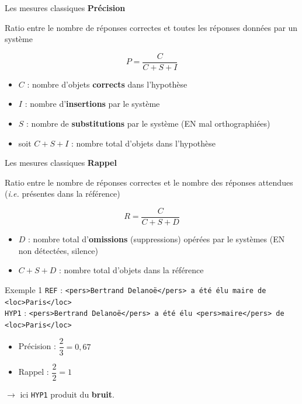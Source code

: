 \documentclass[xetex,xcolor={table,usenames,dvipsnames}]{beamer}
\newcommand{\bolder}[1]{{\color{purple}\bfseries#1}}
\begin{document}
\begin{frame}{Les mesures classiques}
	\bolder{Précision}
	
	Ratio entre le nombre de \textcolor{deepred}{réponses correctes} et toutes les \textcolor{deepred}{réponses données} par un système
	
	\begin{equation*}
		P = \dfrac{C}{C + S + I}
	\end{equation*}
	
	\begin{itemize}
		\item $C$ : nombre d'objets \textcolor{deepblue}{\textbf{corrects}} dans l'hypothèse
		\item $I$ : nombre d'\textcolor{deepblue}{\textbf{insertions}} par le système
		\item $S$ : nombre de \textcolor{deepblue}{\textbf{substitutions}} par le système (\textsc{EN} mal orthographiées)
		\item soit $C + S + I$ : nombre total d'objets dans l'hypothèse
	\end{itemize}
\end{frame}

\begin{frame}{Les mesures classiques}
	\bolder{Rappel}
	
	Ratio entre le nombre de \textcolor{deepred}{réponses correctes} et le nombre des \textcolor{deepred}{réponses attendues} (\textit{i.e.} présentes dans la référence)
	
		\begin{equation*}
		R = \dfrac{C}{C + S + D}
	\end{equation*}
	
	\begin{itemize}
		\item $D$ : nombre total d'\textcolor{deepblue}{\textbf{omissions}} (suppressions) opérées par le systèmes (\textsc{EN} non détectées, silence)
		\item $C + S + D$ : nombre total d'objets dans la référence
	\end{itemize}
\end{frame}

\begin{frame}{Exemple 1}
	\textcolor{deepred}{\texttt{REF}} : \texttt{<pers>Bertrand Delanoë</pers> a été élu maire de <loc>Paris</loc>}\\\medskip
	\textcolor{deepblue}{\texttt{HYP1}} :  \texttt{<pers>Bertrand Delanoë</pers> a été élu <pers>maire</pers> de <loc>Paris</loc>}
	
	\begin{itemize}
		\item Précision : $\dfrac{2}{3} = 0,67$
		\item Rappel :  $\dfrac{2}{2} = 1$
	\end{itemize}
	
	$\rightarrow$ ici \texttt{HYP1} produit du \bolder{bruit}.
\end{frame}
\end{document}

